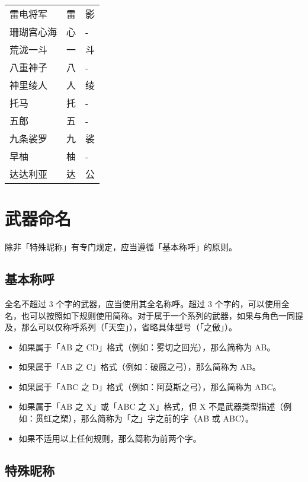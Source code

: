 \begin{longtabu}{|X[2c]|X[c]|X[c]|}
	{雷电将军} & {雷} & {影} \\
	{珊瑚宫心海} & {心} & {-} \\
	{荒泷一斗} & {一} & {斗} \\
	{八重神子} & {八} & {-} \\
	{神里绫人} & {人} & {绫} \\
	\hline
	{托马} & {托} & {-} \\
	{五郎} & {五} & {-} \\
	{九条裟罗} & {九} & {裟} \\
	{早柚} & {柚} & {-} \\
	\hline
	{达达利亚} & {达} & {公} \\
\end{longtabu}




\section{武器命名}

除非「特殊昵称」有专门规定，应当遵循「基本称呼」的原则。

\subsection{基本称呼}

全名不超过 3 个字的武器，应当使用其全名称呼。超过 3 个字的，可以使用全名，也可以按照如下规则使用简称。对于属于一个系列的武器，如果与角色一同提及，那么可以仅称呼系列（「天空」），省略具体型号（「之傲」）。

\begin{itemize}
	\item 如果属于「AB 之 CD」格式（例如：雾切之回光），那么简称为 AB。
	\item 如果属于「AB 之 C」格式（例如：破魔之弓），那么简称为 AB。
	\item 如果属于「ABC 之 D」格式（例如：阿莫斯之弓），那么简称为 ABC。
	\item 如果属于「AB 之 X」或「ABC 之 X」格式，但 X 不是武器类型描述（例如：贯虹之槊），那么简称为「之」字之前的字（AB 或 ABC）。
	\item 如果不适用以上任何规则，那么简称为前两个字。
\end{itemize}

\subsection{特殊昵称}

